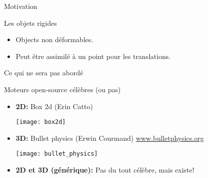\begin{frame}{Motivation}
    \begin{figure}[h]
        \setcounter{subfigure}{0}
    \end{figure}
\end{frame}

\begin{frame}{Les objets rigides}
    \begin{itemize}
        \item Objects non déformables.
        \item Peut être assimilé à un point pour les translations.
    \end{itemize}
    \begin{figure}[h]
        \setcounter{subfigure}{0}
    \end{figure}
\end{frame}

\begin{frame}{Ce qui ne sera pas abordé}
    \begin{figure}[h]
        \setcounter{subfigure}{0}
        \pause
        \pause
    \end{figure}
\end{frame}

\begin{frame}{Moteurs open-source célèbres (ou pas)}
    \begin{itemize}
        \item \textbf{2D:} Box 2d (Erin Catto)
            \begin{center}
                \texttt{[image: box2d]}
            \end{center}
        \item \textbf{3D:} Bullet physics (Erwin Courmand)
            \href{http://www.bulletphysics.org/Bullet/phpBB3/}{www.bulletphysics.org}
            \begin{center}
                \texttt{[image: bullet\_physics]}
            \end{center}
            \pause
        \item \textbf{2D et 3D (générique):} Pas du tout célèbre, mais existe!
    \end{itemize}
\end{frame}
